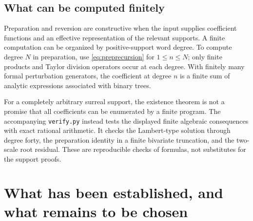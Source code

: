 \documentclass[11pt,oneside]{article}
\numberwithin{equation}{section}
\theoremstyle{definition}
\theoremstyle{remark}\newtheorem{remark}[theorem]{Remark}
\begin{document}
\subsection{What can be computed finitely}
Preparation and reversion are constructive when the input supplies
coefficient functions and an effective representation of the relevant
supports. A finite computation can be organized by positive-support word
degree. To compute degree $N$ in preparation, use
\eqref{eq:preprecursion} for $1\leq n\leq N$; only finite products and
Taylor division operators occur at each degree. With finitely many formal
perturbation generators, the coefficient at degree $n$ is a finite sum of
analytic expressions associated with binary trees.

For a completely arbitrary surreal support, the existence theorem is not
a promise that all coefficients can be enumerated by a finite program.
The accompanying \texttt{verify.py} instead tests the displayed finite
algebraic consequences with exact rational arithmetic. It checks the
Lambert-type solution through degree forty, the preparation identity in
a finite bivariate truncation, and the two-scale root residual. These are
reproducible checks of formulas, not substitutes for the support proofs.

\section{What has been established, and what remains to be chosen}
\end{document}

